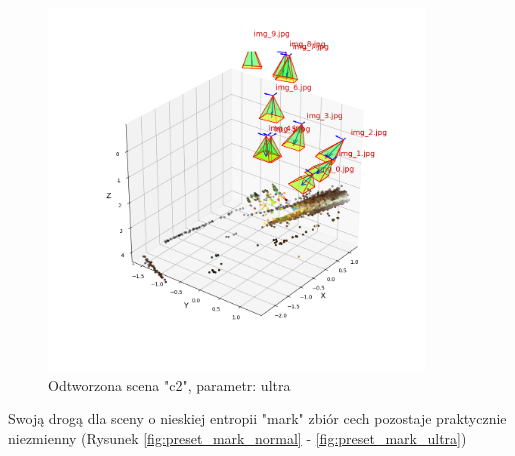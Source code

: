 \begin{figure}[h]
   \centering
   \includegraphics[width=10cm]{preset_c2/ultra.png}
   \caption{Odtworzona scena "c2", parametr: ultra}
   \label {fig:preset_c2_ultra}
\end{figure}

Swoją drogą dla sceny o nieskiej entropii "mark" zbiór cech pozostaje praktycznie niezmienny (Rysunek \ref{fig:preset_mark_normal} - \ref{fig:preset_mark_ultra})

